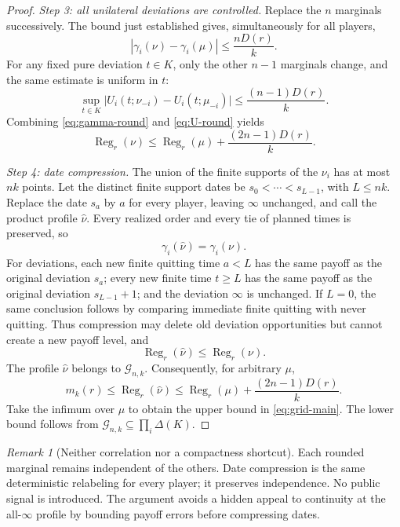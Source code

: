 \documentclass[11pt,a4paper]{article}
\numberwithin{equation}{section}
\theoremstyle{plain}
\theoremstyle{definition}
\theoremstyle{remark}
\newtheorem{remark}[theorem]{Remark}
\newcommand{\Reg}{\operatorname{Reg}}
\begin{document}
\begin{proof}
\emph{Step 3: all unilateral deviations are controlled.}
Replace the $n$ marginals successively. The bound just established
gives, simultaneously for all players,
\begin{equation}\label{eq:gamma-round}
 |\gamma_i(\nu)-\gamma_i(\mu)|\le\frac{nD(r)}k.
\end{equation}
For any fixed pure deviation $t\in K$, only the other $n-1$
marginals change, and the same estimate is uniform in $t$:
\begin{equation}\label{eq:U-round}
 \sup_{t\in K}\bigl|U_i(t;\nu_{-i})-U_i(t;\mu_{-i})\bigr|
 \le\frac{(n-1)D(r)}k.
\end{equation}
Combining \eqref{eq:gamma-round} and \eqref{eq:U-round} yields
\begin{equation}\label{eq:reg-round}
 \Reg_r(\nu)\le\Reg_r(\mu)+\frac{(2n-1)D(r)}k.
\end{equation}

\emph{Step 4: date compression.}
The union of the finite supports of the $\nu_i$ has at most $nk$
points. Let the distinct finite support dates be
$s_0<\cdots<s_{L-1}$, with $L\le nk$. Replace the date $s_a$ by $a$
for every player, leaving $\infty$ unchanged, and call the product
profile $\widehat\nu$. Every realized order and every tie of planned
times is preserved, so
\begin{equation}\label{eq:compress-gamma}
 \gamma_i(\widehat\nu)=\gamma_i(\nu).
\end{equation}
For deviations, each new finite quitting time $a<L$ has the same
payoff as the original deviation $s_a$; every new finite time
$t\ge L$ has the same payoff as the original deviation
$s_{L-1}+1$; and the deviation $\infty$ is unchanged. If $L=0$,
the same conclusion follows by comparing immediate finite quitting
with never quitting. Thus compression may delete old deviation
opportunities but cannot create a new payoff level, and
\begin{equation}\label{eq:compress-reg}
 \Reg_r(\widehat\nu)\le\Reg_r(\nu).
\end{equation}
The profile $\widehat\nu$ belongs to $\mathcal G_{n,k}$.
Consequently, for arbitrary $\mu$,
\[
 m_k(r)\le\Reg_r(\widehat\nu)
 \le\Reg_r(\mu)+\frac{(2n-1)D(r)}k.
\]
Take the infimum over $\mu$ to obtain the upper bound in
\eqref{eq:grid-main}. The lower bound follows from
$\mathcal G_{n,k}\subseteq\prod_i\Delta(K)$.
\end{proof}

\begin{remark}[Neither correlation nor a compactness shortcut]
Each rounded marginal remains independent of the others. Date
compression is the same deterministic relabeling for every player;
it preserves independence. No public signal is introduced. The
argument avoids a hidden appeal to continuity at the all-$\infty$
profile by bounding payoff errors before compressing dates.
\end{remark}
\end{document}
